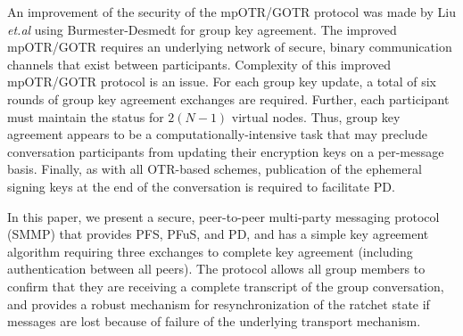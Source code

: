 \documentclass[%
preprint,
amsmath,amssymb,
aps,
prb,
floatfix,
]{revtex4-1}
\begin{document}
An improvement of the security of the mpOTR/GOTR protocol was made by Liu
\textit{et.al}\cite{ref:liu} using Burmester-Desmedt\cite{ref:burmester}
for group key agreement. The improved mpOTR/GOTR requires an
underlying network of secure, binary communication channels that exist between
participants.
Complexity of this improved mpOTR/GOTR protocol is an issue. For each group key
update, a total of six rounds of group key agreement exchanges are required.
Further, each participant must maintain the status for $2(N-1)$ virtual nodes.
Thus, group key agreement appears to be a computationally-intensive task that
may preclude conversation participants from updating their encryption keys on a
per-message basis. Finally, as with all OTR-based schemes, publication of the
ephemeral signing keys at the end of the conversation is required to facilitate
PD.

In this paper, we present a secure, peer-to-peer multi-party messaging protocol
(SMMP) that provides PFS, PFuS, and PD, and has a simple key agreement
algorithm requiring three exchanges to complete key agreement (including
authentication between all peers).
The protocol allows all group members to confirm that they are
receiving a complete transcript of the group conversation, and provides a
robust mechanism for resynchronization of the ratchet state if messages are lost
because of failure of the underlying transport mechanism.
\end{document}

